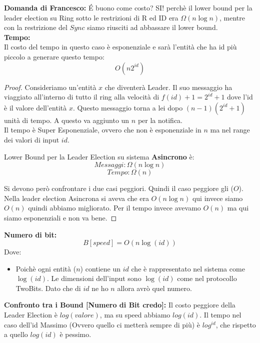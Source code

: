 \textbf{Domanda di Francesco:}
\'E buono come costo? SI! perchè il lower bound per la leader election su Ring
sotto le restrizioni di R ed ID era $\Omega(n \log n)$, mentre con la
restrizione del $Sync$ siamo riusciti ad abbassare il lower bound.\\

\textbf{Tempo:}\\
Il costo del tempo in questo caso è esponenziale e sarà l'entità che ha id più
piccolo a generare questo tempo: $$O(n 2^{id})$$

\begin{proof}
    Consideriamo
    un'entità $x$ che diventerà Leader. Il suo messaggio ha viaggiato all'interno di
    tutto il ring alla velocità di $f(id)+1 = 2^{id}+1$ dove l'id è il valore
    dell'entità $x$. Questo messaggio torna a lei dopo $(n-1)(2^{id}+1)$ unità di
    tempo. A questo va aggiunto un $n$ per la notifica.\\
    Il tempo è Super Esponenziale, ovvero che non è esponenziale in $n$ ma nel range
    dei valori di input $id$.\\

    \begin{center}
        Lower Bound per la Leader Election su sistema \textbf{Asincrono} è:
        $$Messaggi: \Omega(n \log n) $$ $$Tempo: \Omega(n)$$
    \end{center}

    Si devono però confrontare i due casi peggiori. Quindi il caso peggiore gli
    ($O$). Nella leader election Asincrona si aveva che era $O(n \log n)$ qui invece
    siamo $O(n)$ quindi abbiamo migliorato. Per il tempo invece avevamo $O(n)$ ma
    qui siamo esponenziali e non va bene.
\end{proof}

\textbf{Numero di bit:} $$B[speed] = O(n \log(id))$$ Dove:
\begin{itemize}
    \item Poichè ogni entità ($n$) contiene un $id$ che è rappresentato nel
          sistema come $\log(id)$. Le dimensioni dell'input sono $\log(id)$ come nel
          protocollo TwoBits. Dato che di $id$ ne ho $n$ allora avrò quel numero.
\end{itemize}

\textbf{Confronto tra i Bound [Numero di Bit credo]:}
Il costo peggiore della Leader Election è $log(valore)$, ma su speed abbiamo
$log(id)$. Il tempo nel caso dell'id Massimo (Ovvero quello ci metterà sempre di
più) è $log^{id}$, che rispetto a quello $log(id)$ è pessimo.


